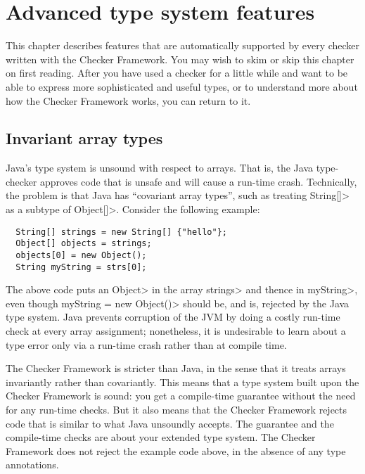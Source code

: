 \htmlhr
\chapter{Advanced type system features\label{advanced-type-system-features}}

This chapter describes features that are automatically supported by every
checker written with the Checker Framework.
You may wish to skim or skip this chapter on first reading.  After you have
used a checker for a little while and want to be able to express more
sophisticated and useful types, or to understand more about how the Checker
Framework works, you can return to it.


\section{Invariant array types\label{invariant-arrays}}

Java's type system is unsound with respect to arrays.  That is, the Java
type-checker approves code that is unsafe and will cause a run-time crash.
Technically, the problem is that Java has ``covariant array types'', such
as treating \<String[]> as a subtype of \<Object[]>.  Consider the
following example:

\begin{Verbatim}
  String[] strings = new String[] {"hello"};
  Object[] objects = strings;
  objects[0] = new Object();
  String myString = strs[0];
\end{Verbatim}

\noindent
The above code puts an \<Object> in the array \<strings> and thence in
\<myString>, even though \<myString = new Object()> should be, and is,
rejected by the Java type system.  Java prevents corruption of the JVM by
doing a costly run-time check at every array assignment; nonetheless, it is
undesirable to learn about a type error only via a run-time crash rather
than at compile time.

The Checker Framework is stricter than Java, in the sense that it treats
arrays invariantly rather than covariantly.  This means that a type system
built upon the Checker Framework is sound:  you get a compile-time
guarantee without the need for any run-time checks.  But it also means that
the Checker Framework rejects code that is similar to what Java unsoundly
accepts.  The guarantee and the compile-time checks are about your
extended type system.  The Checker Framework does not reject the example
code above, in the absence of any type annotations.


